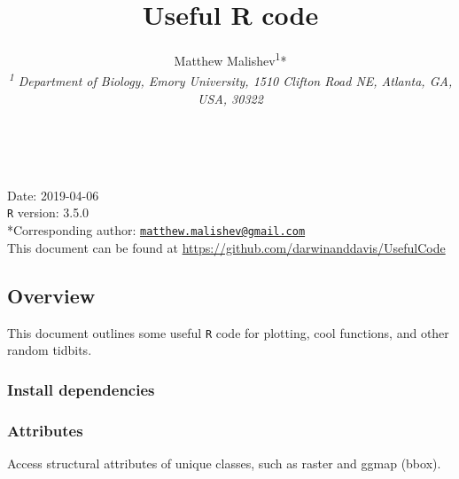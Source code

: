 \documentclass[10,portrait]{article}
\title{Useful R code}
\author{Matthew
Malishev\textsuperscript{1}*\\[2\baselineskip]\emph{\textsuperscript{1}
Department of Biology, Emory University, 1510 Clifton Road NE, Atlanta,
GA, USA, 30322}}
\date{}
\newenvironment{Shaded}{\begin{snugshade}}{\end{snugshade}}
\newcommand{\KeywordTok}[1]{\textcolor[rgb]{0.13,0.29,0.53}{\textbf{#1}}}
\newcommand{\DataTypeTok}[1]{\textcolor[rgb]{0.13,0.29,0.53}{#1}}
\newcommand{\DecValTok}[1]{\textcolor[rgb]{0.00,0.00,0.81}{#1}}
\newcommand{\StringTok}[1]{\textcolor[rgb]{0.31,0.60,0.02}{#1}}
\newcommand{\CommentTok}[1]{\textcolor[rgb]{0.56,0.35,0.01}{\textit{#1}}}
\newcommand{\OperatorTok}[1]{\textcolor[rgb]{0.81,0.36,0.00}{\textbf{#1}}}
\newcommand{\NormalTok}[1]{#1}
\begin{document}
\maketitle

{
\hypersetup{linkcolor=black}
\setcounter{tocdepth}{4}
\tableofcontents
}
~

Date: 2019-04-06\\
\texttt{R} version: 3.5.0\\
*Corresponding author:
\href{mailto:matthew.malishev@gmail.com}{\nolinkurl{matthew.malishev@gmail.com}}\\
This document can be found at
\url{https://github.com/darwinanddavis/UsefulCode}

\newpage  

\subsection{Overview}\label{overview}

This document outlines some useful \texttt{R} code for plotting, cool
functions, and other random tidbits.

\subsubsection{Install dependencies}\label{install-dependencies}

\subsubsection{Attributes}\label{attributes}

Access structural attributes of unique classes, such as raster and ggmap
(bbox).

\begin{Shaded}
\end{Shaded}
\end{document}
